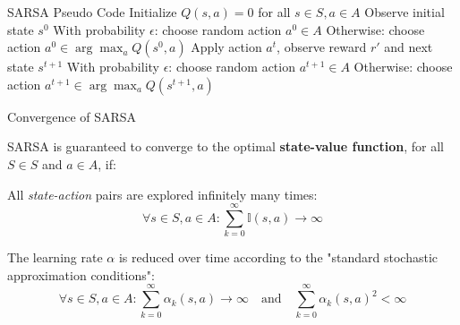\begin{frame}[fragile]{SARSA Pseudo Code}
    \centering 
        \State Initialize \( Q(s, a) = 0 \) for all \( s \in S, a \in A \)
            \State Observe initial state \( s^0 \)
            \State With probability \( \epsilon \): choose random action \( a^0 \in A \)
            \State Otherwise: choose action \( a^0 \in \arg\max_a Q(s^0, a) \)
                \State Apply action \( a^t \), observe reward \( r' \) and next state \( s^{t+1} \)
                \State With probability \( \epsilon \): choose random action \( a^{t+1} \in A \)
                \State Otherwise: choose action \( a^{t+1} \in \arg\max_a Q(s^{t+1}, a) \)
                \State {}
            \EndFor
        \EndFor
    \ealg
\end{frame}

\begin{frame}[t]{Convergence of SARSA}

    SARSA is guaranteed to converge to the optimal \textbf{state-value function}, for all $S \in S$ and $a \in A$, if:
    \blist
        \item<1-> All \textit{state-action} pairs are explored infinitely many times: $$\forall s \in S, a \in A: \sum_{k=0}^{\infty} \mathbb{I}(s, a) \to \infty $$

        \item<2-> The learning rate $\alpha$ is reduced over time according to the "standard stochastic approximation conditions": $$\forall s \in S, a \in A: \sum_{k=0}^{\infty} \alpha_k(s, a) \to \infty \quad \text{and} \quad \sum_{k=0}^{\infty} \alpha_k(s, a)^2 < \infty$$
    \elist        
\end{frame}

